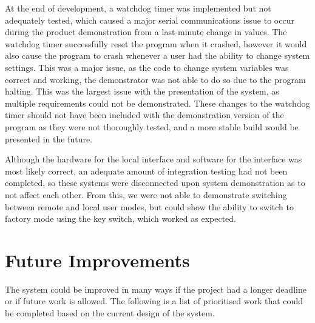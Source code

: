 \documentclass[]{report}
\begin{document}
At the end of development, a watchdog timer was implemented but not adequately tested, which caused a major serial communications issue to occur during the product demonstration from a last-minute change in values. The watchdog timer successfully reset the program when it crashed, however it would also cause the program to crash whenever a user had the ability to change system settings. This was a major issue, as the code to change system variables was correct and working, the demonstrator was not able to do so due to the program halting. This was the largest issue with the presentation of the system, as multiple requirements could not be demonstrated. These changes to the watchdog timer should not have been included with the demonstration version of the program as they were not thoroughly tested, and a more stable build would be presented in the future.

Although the hardware for the local interface and software for the interface was most likely correct, an adequate amount of integration testing had not been completed, so these systems were disconnected upon system demonstration as to not affect each other. From this, we were not able to demonstrate switching between remote and local user modes, but could show the ability to switch to factory mode using the key switch, which worked as expected.

\section{Future Improvements}
The system could be improved in many ways if the project had a longer deadline or if future work is allowed. The following is a list of prioritised work that could be completed based on the current design of the system.
\end{document}
